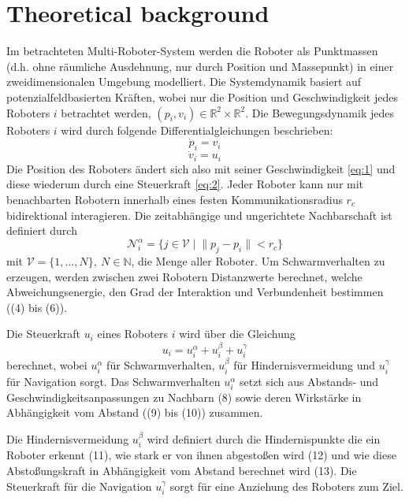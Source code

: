 \documentclass[conference]{IEEEtran}
\begin{document}
\section{Theoretical background}
Im betrachteten Multi-Roboter-System werden die Roboter als Punktmassen 
(d.h. ohne räumliche Ausdehnung, nur durch Position und Massepunkt) in einer 
zweidimensionalen Umgebung modelliert. Die Systemdynamik basiert auf potenzialfeldbasierten 
Kräften, wobei nur die Position und Geschwindigkeit jedes Roboters $i$ betrachtet werden,
$(p_i, v_i) \in \mathbb{R}^2 \times \mathbb{R}^2$.
Die Bewegungsdynamik jedes Roboters $i$ wird durch folgende Differentialgleichungen beschrieben:
\begin{equation}
    \dot{p}_i = v_i
    \label{eq:1}
\end{equation}
\begin{equation}
    \dot{v}_i = u_i
    \label{eq:2}
\end{equation}
Die Position des Roboters ändert sich also mit seiner Geschwindigkeit \eqref{eq:1} und diese wiederum 
durch eine Steuerkraft \eqref{eq:2}.
Jeder Roboter kann nur mit benachbarten Robotern innerhalb eines festen 
Kommunikationsradius $r_c$ bidirektional interagieren. Die zeitabhängige und ungerichtete 
Nachbarschaft ist definiert durch
\begin{equation}
    \mathcal{N}_i^\alpha = \{ j \in \mathcal{V} \; | \; \| p_j - p_i \| < r_c \}
    \label{eq:3}
\end{equation}
mit $\mathcal{V} = \{1, \ldots, N\},\ N \in \mathbb{N}$, die Menge aller Roboter.
Um Schwarmverhalten zu erzeugen, werden zwischen zwei Robotern Distanzwerte berechnet, 
welche Abweichungsenergie, den Grad der Interaktion und Verbundenheit bestimmen ((4) bis (6)).

Die Steuerkraft $u_i$ eines Roboters $i$ wird über die Gleichung
\begin{equation}
    u_i = u_i^\alpha + u_i^\beta + u_i^\gamma
    \label{eq:4}
\end{equation}
berechnet, wobei $u_i^\alpha$ für Schwarmverhalten, $u_i^\beta$ für 
Hindernisvermeidung und $u_i^\gamma$ für Navigation sorgt. Das Schwarmverhalten 
$u_i^\alpha$ setzt sich aus Abstands- und Geschwindigkeitsanpassungen zu Nachbarn (8) 
sowie deren Wirkstärke in Abhängigkeit vom Abstand ((9) bis (10)) zusammen.

Die Hindernisvermeidung $u_i^\beta$ wird definiert durch die Hindernispunkte 
die ein Roboter erkennt (11), wie stark er von ihnen 
abgestoßen wird (12) und wie diese Abstoßungskraft in Abhängigkeit vom Abstand 
berechnet wird (13). Die Steuerkraft für die Navigation $u_i^\gamma$ sorgt für eine Anziehung
des Roboters zum Ziel.
\end{document}
